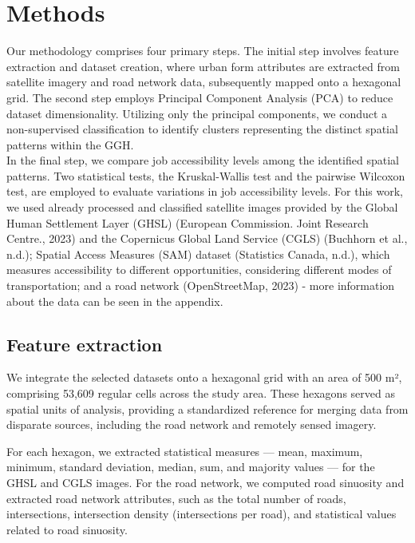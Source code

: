 \documentclass[conference,final,]{IEEEtran}
\begin{document}
\hypertarget{methods}{%
\section{Methods}\label{methods}}

Our methodology comprises four primary steps. The initial step involves
feature extraction and dataset creation, where urban form attributes are
extracted from satellite imagery and road network data, subsequently
mapped onto a hexagonal grid. The second step employs Principal
Component Analysis (PCA) to reduce dataset dimensionality. Utilizing
only the principal components, we conduct a non-supervised
classification to identify clusters representing the distinct spatial
patterns within the GGH.\\
In the final step, we compare job accessibility levels among the
identified spatial patterns. Two statistical tests, the Kruskal-Wallis
test and the pairwise Wilcoxon test, are employed to evaluate variations
in job accessibility levels. For this work, we used already processed
and classified satellite images provided by the Global Human Settlement
Layer (GHSL) (European Commission. Joint Research Centre., 2023) and the
Copernicus Global Land Service (CGLS) (Buchhorn et al., n.d.); Spatial
Access Measures (SAM) dataset (Statistics Canada, n.d.), which measures
accessibility to different opportunities, considering different modes of
transportation; and a road network (OpenStreetMap, 2023) - more
information about the data can be seen in the appendix.

\hypertarget{feature-extraction}{%
\subsection{Feature extraction}\label{feature-extraction}}

We integrate the selected datasets onto a hexagonal grid with an area of
500 m², comprising 53,609 regular cells across the study area. These
hexagons served as spatial units of analysis, providing a standardized
reference for merging data from disparate sources, including the road
network and remotely sensed imagery.

For each hexagon, we extracted statistical measures --- mean, maximum,
minimum, standard deviation, median, sum, and majority values --- for
the GHSL and CGLS images. For the road network, we computed road
sinuosity and extracted road network attributes, such as the total
number of roads, intersections, intersection density (intersections per
road), and statistical values related to road sinuosity.
\end{document}
